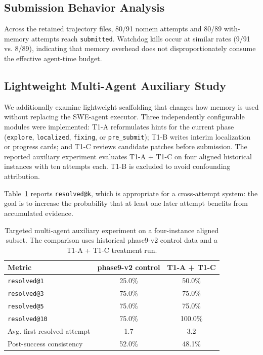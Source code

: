 \documentclass[runningheads]{llncs}
\begin{document}
\subsection{Submission Behavior Analysis}

Across the retained trajectory files, 80/91 nomem attempts and 80/89 with-memory attempts reach \texttt{submitted}. Watchdog kills occur at similar rates (9/91 vs. 8/89), indicating that memory overhead does not disproportionately consume the effective agent-time budget.

\subsection{Lightweight Multi-Agent Auxiliary Study}
\label{sec:multiagent}

We additionally examine lightweight scaffolding that changes how memory is used without replacing the SWE-agent executor. Three independently configurable modules were implemented: T1-A reformulates hints for the current phase (\texttt{explore}, \texttt{localized}, \texttt{fixing}, or \texttt{pre\_submit}); T1-B writes interim localization or progress cards; and T1-C reviews candidate patches before submission. The reported auxiliary experiment evaluates T1-A + T1-C on four aligned historical instances with ten attempts each. T1-B is excluded to avoid confounding attribution.

Table~\ref{tab:multiagent_overall} reports \texttt{resolved@k}, which is appropriate for a cross-attempt system: the goal is to increase the probability that at least one later attempt benefits from accumulated evidence.

\begin{table}[h]
\centering
\caption{Targeted multi-agent auxiliary experiment on a four-instance aligned subset. The comparison uses historical phase9-v2 control data and a T1-A + T1-C treatment run.}
\label{tab:multiagent_overall}
\begin{tabular}{lcc}
\toprule
\textbf{Metric} & \textbf{phase9-v2 control} & \textbf{T1-A + T1-C} \\
\midrule
\texttt{resolved@1} & 25.0\% & 50.0\% \\
\texttt{resolved@3} & 75.0\% & 75.0\% \\
\texttt{resolved@5} & 75.0\% & 75.0\% \\
\texttt{resolved@10} & 75.0\% & 100.0\% \\
Avg. first resolved attempt & 1.7 & 3.2 \\
Post-success consistency & 52.0\% & 48.1\% \\
\bottomrule
\end{tabular}
\end{table}
\end{document}
